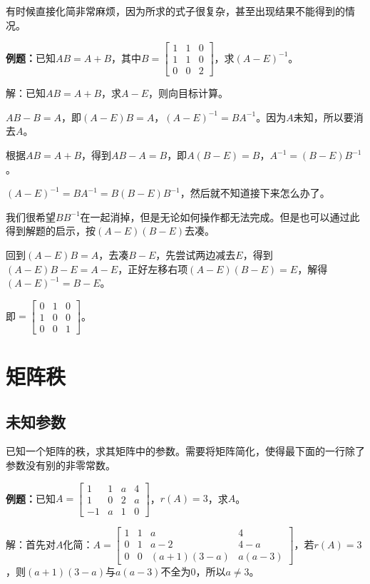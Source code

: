 \documentclass[UTF8, 12pt]{ctexart}
\begin{document}
有时候直接化简非常麻烦，因为所求的式子很复杂，甚至出现结果不能得到的情况。

\textbf{例题：}已知$AB=A+B$，其中$B=\left[\begin{array}{ccc}
    1 & 1 & 0 \\
    1 & 1 & 0 \\
    0 & 0 & 2
\end{array}\right]$，求$(A-E)^{-1}$。

解：已知$AB=A+B$，求$A-E$，则向目标计算。

$AB-B=A$，即$(A-E)B=A$，$(A-E)^{-1}=BA^{-1}$。因为$A$未知，所以要消去$A$。

根据$AB=A+B$，得到$AB-A=B$，即$A(B-E)=B$，$A^{-1}=(B-E)B^{-1}$。

$(A-E)^{-1}=BA^{-1}=B(B-E)B^{-1}$，然后就不知道接下来怎么办了。

我们很希望$BB^{-1}$在一起消掉，但是无论如何操作都无法完成。但是也可以通过此得到解题的启示，按$(A-E)(B-E)$去凑。

回到$(A-E)B=A$，去凑$B-E$，先尝试两边减去$E$，得到$(A-E)B-E=A-E$，正好左移右项$(A-E)(B-E)=E$，解得$(A-E)^{-1}=B-E$。

即$=\left[\begin{array}{ccc}
    0 & 1 & 0 \\
    1 & 0 & 0 \\
    0 & 0 & 1
\end{array}\right]$。

\section{矩阵秩}

\subsection{未知参数}

已知一个矩阵的秩，求其矩阵中的参数。需要将矩阵简化，使得最下面的一行除了参数没有别的非零常数。

\textbf{例题：}已知$A=\left[\begin{array}{cccc}
    1 & 1 & a & 4 \\
    1 & 0 & 2 & a \\
    -1 & a & 1 & 0
\end{array}\right]$，$r(A)=3$，求$A$。

解：首先对$A$化简：$A=\left[\begin{array}{cccc}
    1 & 1 & a & 4 \\
    0 & 1 & a-2 & 4-a \\
    0 & 0 & (a+1)(3-a) & a(a-3)
\end{array}\right]$，若$r(A)=3$，则$(a+1)(3-a)$与$a(a-3)$不全为0，所以$a\neq3$。
\end{document}
